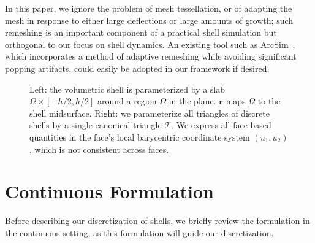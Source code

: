 \documentclass[timestamp,acmtog]{acmart}
\newcommand{\br}{\mathbf{r}}
\newcommand{\bff}{\mathbf{f}}
\newcommand{\hn}{\hat{\mathbf{n}}}
\begin{document}
In this paper, we ignore the problem of mesh tessellation, or of adapting the mesh in response to either large deflections or large amounts of growth; such remeshing is an important component of a practical shell simulation but orthogonal to our focus on shell dynamics. An existing tool such as ArcSim~\cite{Narain2012}, which incorporates a method of adaptive remeshing while avoiding significant popping artifacts, could easily be adopted in our framework if desired.

\begin{figure}
\caption{Left: the volumetric shell is parameterized by a slab $\Omega \times [-h/2,h/2]$ around a region $\Omega$ in the plane. $\br$ maps $\Omega$ to the shell midsurface. Right: we parameterize all triangles of discrete shells by a single canonical triangle $\mathcal{T}$. We express all face-based quantities in the face's local barycentric coordinate system $(u_1,u_2)$, which is not consistent across faces.}
\label{fig:technical}
\end{figure}
\section{Continuous Formulation} \label{sec:continuous}
Before describing our discretization of shells, we briefly review the formulation in the continuous setting, as this formulation will guide our discretization. 
\end{document}
